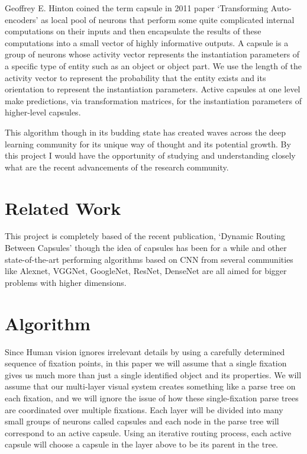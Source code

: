 \documentclass[10pt,twocolumn,letterpaper]{article}
\begin{document}
Geoffrey E. Hinton coined the term capsule in 2011 paper `Transforming Auto-encoders' as local pool of neurons that perform some quite complicated internal computations on their inputs and then encapsulate the results of these computations into a small vector of highly informative outputs. A capsule is a group of neurons whose activity vector represents the instantiation parameters of a specific type of entity such as an object or object part. We use the length of the activity vector to represent the probability that the entity exists and its orientation to represent the instantiation parameters. Active capsules at one level make predictions, via transformation matrices, for the instantiation parameters of higher-level capsules.

This algorithm though in its budding state has created waves across the deep learning community for its unique way of thought and its potential growth. By this project I would have the opportunity of studying and understanding closely what are the recent advancements of the research community.




\section{Related Work}
This project is completely based of the recent publication, `Dynamic Routing Between Capsules'\cite{dynamicRouting} though the idea of capsules has been for a while and other state-of-the-art performing algorithms based on CNN from several communities like Alexnet, VGGNet, GoogleNet, ResNet, DenseNet are all aimed for bigger problems with higher dimensions.

\section{Algorithm}
Since Human vision ignores irrelevant details by using a carefully determined sequence of fixation points, in this paper we will assume that a single fixation gives us much more than just a single identified object and its properties. We will assume that our multi-layer visual system creates something like a parse tree on each fixation, and we will ignore the issue of how these single-fixation parse trees are coordinated over multiple fixations. Each layer will be divided into many small groups of neurons called capsules and each node in the parse tree will correspond to an active capsule. Using an iterative routing process, each active capsule will choose a capsule in the layer above to be its parent in the tree.\\
\end{document}

